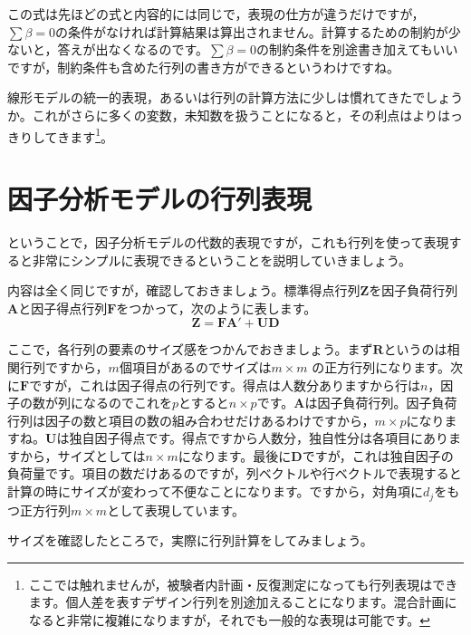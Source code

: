 \documentclass{ltjsbook}
\begin{document}
この式は先ほどの式と内容的には同じで，表現の仕方が違うだけですが，$\sum \beta= 0$の条件がなければ計算結果は算出されません。計算するための制約が少ないと，答えが出なくなるのです。$\sum \beta= 0$の制約条件を別途書き加えてもいいですが，制約条件も含めた行列の書き方ができるというわけですね。

線形モデルの統一的表現，あるいは行列の計算方法に少しは慣れてきたでしょうか。これがさらに多くの変数，未知数を扱うことになると，その利点はよりはっきりしてきます\footnote{ここでは触れませんが，被験者内計画・反復測定になっても行列表現はできます。個人差を表すデザイン行列を別途加えることになります。混合計画になると非常に複雑になりますが，それでも一般的な表現は可能です。}。

\section{ 因子分析モデルの行列表現}
ということで，因子分析モデルの代数的表現ですが，これも行列を使って表現すると非常にシンプルに表現できるということを説明していきましょう。

内容は全く同じですが，確認しておきましょう。標準得点行列$\bm{Z}$を因子負荷行列$\bm{A}$と因子得点行列$\bm{F}$をつかって，次のように表します。
\begin{equation}
\bm{Z} = \bm{F} \bm{A} ' + \bm{U} \bm{D}
\end{equation}

ここで，各行列の要素のサイズ感をつかんでおきましょう。まず$\bm{R}$というのは相関行列ですから，$m$個項目があるのでサイズは$m \times m$ の正方行列になります。次に$\bm{F}$ですが，これは因子得点の行列です。得点は人数分ありますから行は$n$，因子の数が列になるのでこれを$p$とすると$n\times p$です。$\bm{A}$は因子負荷行列。因子負荷行列は因子の数と項目の数の組み合わせだけあるわけですから，$m \times p$になりますね。$\bm{U}$は独自因子得点です。得点ですから人数分，独自性分は各項目にありますから，サイズとしては$n \times m$になります。最後に$\bm{D}$ですが，これは独自因子の負荷量です。項目の数だけあるのですが，列ベクトルや行ベクトルで表現すると計算の時にサイズが変わって不便なことになります。ですから，対角項に$d_j$をもつ正方行列$m \times m$として表現しています。

サイズを確認したところで，実際に行列計算をしてみましょう。
\end{document}
